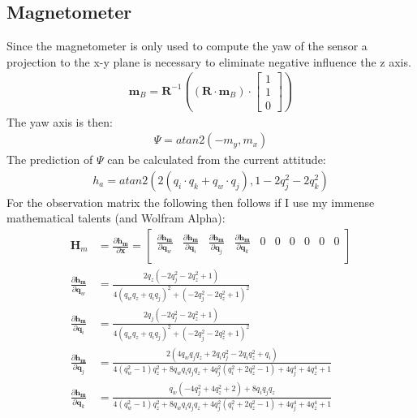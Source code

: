 \documentclass[10pt,a4paper]{article}
\newcommand{\M}[1]{\mathbf{#1}}
\newcommand{\V}[1]{\mathbf{#1}}
\begin{document}
\subsection{Magnetometer}Since the magnetometer is only used to compute the yaw of the sensor a projection to the x-y plane is necessary to eliminate negative influence the z axis.
\begin{align}
  \V m_B = \M R^{-1} \left ((\M R \cdot \V m_B) \cdot
  \begin{bmatrix}
    1 \\ 1 \\ 0
  \end{bmatrix} \right)
\end{align}
The yaw axis is then: 
\begin{align}
  \Psi = atan2 (- m_y, m_x)
\end{align}
The prediction of $\Psi$ can be calculated from the current attitude: 
\begin{align}
  h_a = atan2 (2 (q_i \cdot q_k + q_w \cdot q_j), 1 - 2  q_j^2 - 2 q_k^2)
\end{align}
For the observation matrix the following then follows if I use my immense mathematical talents (and Wolfram Alpha):
\begin{align}
  \M H_m &=  \frac {\partial \V {h_m}}  {\partial \V x} = \begin{bmatrix}
    \frac { \partial \V {h_m}}  {\partial \V q_w} &
    \frac { \partial \V {h_m}}  {\partial \V q_i} &
    \frac { \partial \V {h_m}}  {\partial \V q_j} &
    \frac { \partial \V {h_m}}  {\partial \V q_k} &
    0 & 0 & 0& 0 & 0 & 0 \\
  \end{bmatrix} \\
    \frac { \partial \V {h_m}}  {\partial \V q_w} &= \frac { 2 q_z (-2 q_j^2 - 2 q_z^2 + 1)}{4 (q_w q_z + q_i q_j)^2 + (-2 q_j^2 - 2 q_z^2 + 1)^2} \\ 
    \frac { \partial \V {h_m}}  {\partial \V q_i} &= \frac {2 q_j (-2 q_j^2 - 2 q_z^2 + 1)}{4 (q_w q_z + q_i q_j)^2 + (-2 q_j^2 - 2 q_z^2 + 1)^2} \\
    \frac { \partial \V {h_m}}  {\partial \V q_j} &= \frac {2 (4 q_w q_j q_z + 2 q_i q_j^2 - 2 q_i q_z^2 + q_i)}{4 (q_w^2 - 1) q_z^2 + 8 q_w q_i q_j q_z + 4 q_j^2 (q_i^2 + 2 q_z^2 - 1) + 4 q_j^4 + 4 q_z^4 + 1} \\
    \frac { \partial \V {h_m}}  {\partial \V q_k} &= \frac{ q_w (-4 q_j^2 + 4 q_z^2 + 2) + 8 q_i q_j q_z}{4 (q_w^2 - 1) q_z^2 + 8 q_w q_i q_j q_z + 4 q_j^2 (q_i^2 + 2 q_z^2 - 1) + 4 q_j^4 + 4 q_z^4 + 1}
\end{align}
\end{document}
